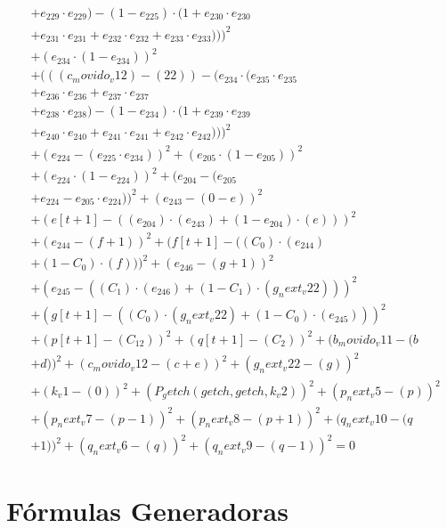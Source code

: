 \documentclass[10pt, a4paper]{article}
\begin{document}
\begin{align*}
& + e_{229} \cdot e_{229}) - (1 - e_{225}) \cdot (1 + e_{230} \cdot e_{230} \\
& + e_{231} \cdot e_{231} + e_{232} \cdot e_{232} + e_{233} \cdot e_{233})))^{2} \\
& + (e_{234} \cdot (1 - e_{234}))^{2} \\
& + (((c_movido_v12) - (22)) - (e_{234} \cdot (e_{235} \cdot e_{235} \\
& + e_{236} \cdot e_{236} + e_{237} \cdot e_{237} \\
& + e_{238} \cdot e_{238}) - (1 - e_{234}) \cdot (1 + e_{239} \cdot e_{239} \\
& + e_{240} \cdot e_{240} + e_{241} \cdot e_{241} + e_{242} \cdot e_{242})))^{2} \\
& + (e_{224} - (e_{225} \cdot e_{234}))^{2} + (e_{205} \cdot (1 - e_{205}))^{2} \\
& + (e_{224} \cdot (1 - e_{224}))^{2} + (e_{204} - (e_{205} \\
& + e_{224} - e_{205} \cdot e_{224}))^{2} + (e_{243} - (0 - e))^{2} \\
& + (e[t+1] - ((e_{204})  \cdot  (e_{243}) + (1 - e_{204})  \cdot  (e)))^{2} \\
& + (e_{244} - (f + 1))^{2} + (f[t+1] - ((C_{0})  \cdot  (e_{244}) \\
& + (1 - C_{0})  \cdot  (f)))^{2} + (e_{246} - (g + 1))^{2} \\
& + (e_{245} - ((C_{1})  \cdot  (e_{246}) + (1 - C_{1})  \cdot  (g_next_v22)))^{2} \\
& + (g[t+1] - ((C_{0})  \cdot  (g_next_v22) + (1 - C_{0})  \cdot  (e_{245})))^{2} \\
& + (p[t+1] - (C_{12}))^{2} + (q[t+1] - (C_{2}))^{2} + (b_movido_v11 - (b \\
& + d))^{2} + (c_movido_v12 - (c + e))^{2} + (g_next_v22 - (g))^{2} \\
& + (k_v1 - (0))^{2} + (P_getch(getch, getch, k_v2))^{2} + (p_next_v5 - (p))^{2} \\
& + (p_next_v7 - (p - 1))^{2} + (p_next_v8 - (p + 1))^{2} + (q_next_v10 - (q \\
& + 1))^{2} + (q_next_v6 - (q))^{2} + (q_next_v9 - (q - 1))^{2} = 0
\end{align*}\part{Fórmulas Generadoras}
\end{document}
